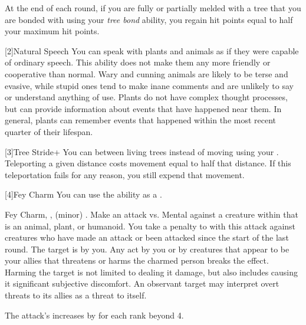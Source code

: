         At the end of each round, if you are fully or partially melded with a tree that you are bonded with using your \textit{tree bond} ability, you regain hit points equal to half your maximum hit points.

        [2]{Natural Speech} You can speak with plants and animals as if they were capable of ordinary speech.
            This ability does not make them any more friendly or cooperative than normal.
            Wary and cunning animals are likely to be terse and evasive, while stupid ones tend to make inane comments and are unlikely to say or understand anything of use.
            Plants do not have complex thought processes, but can provide information about events that have happened near them.
            In general, plants can remember events that happened within the most recent quarter of their lifespan.

        [3]{Tree Stride+} You can  between living trees instead of moving using your .
        Teleporting a given distance costs movement equal to half that distance.
        If this teleportation fails for any reason, you still expend that movement.

        [4]{Fey Charm} You can use the  ability as a .
        \begin{magicalsustainability}{Fey Charm}{, ,  (minor)}
            \abilityusagetime {}.
            \rankline
            Make an attack vs. Mental against a creature within \medrange that is an animal, plant, or humanoid.
            You take a  penalty to  with this attack against creatures who have made an attack or been attacked since the start of the last round.
            \hit The target is \charmed by you.
            Any act by you or by creatures that appear to be your allies that threatens or harms the charmed person breaks the effect.
            Harming the target is not limited to dealing it damage, but also includes causing it significant subjective discomfort.
            An observant target may interpret overt threats to its allies as a threat to itself.

            \rankline

            \noindent The attack's  increases by  for each rank beyond 4.
        \end{magicalsustainability}

